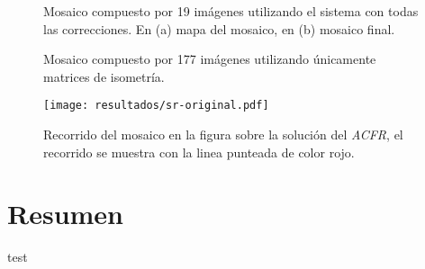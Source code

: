 \begin{figure}[h]
	\centering     
	
	\hspace{10mm}%
	\caption[Mosaico del conjunto \textit{Espenky}]{Mosaico compuesto por 19 imágenes utilizando el sistema con todas las correcciones. En (a) mapa del mosaico, en (b) mosaico final.}
	\label{imagen:full:espenky}
\end{figure}

\begin{figure}[h]
	\centering     
	
	\hspace{10mm}%
	
	\caption[Mosaico del conjunto \textit{ScottReef 25}]{Mosaico compuesto por 177 imágenes utilizando únicamente matrices de isometría.}
	\label{imagen:full:SR2}
\end{figure}

\begin{figure}[h]
	\centering
	\texttt{[image: resultados/sr-original.pdf]}
	\caption[Mosaico del conjunto \textit{ScottReef 25} por el \textit{ACFR}]{Recorrido del mosaico en la figura sobre la solución del \textit{ACFR}, el recorrido se muestra con la linea punteada de color rojo.}
	\label{imagen:full:SR-original}
\end{figure}

\section{Resumen}
test
